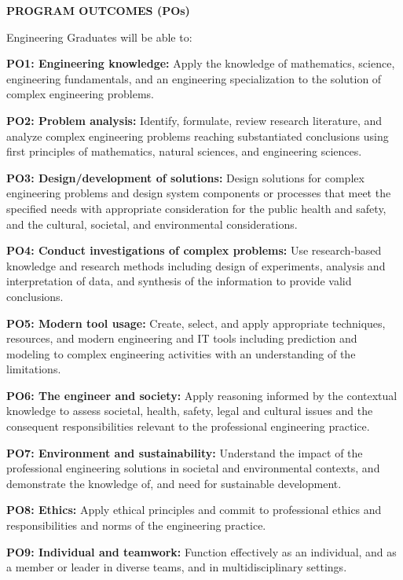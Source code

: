 \begin{flushleft}
{\size\textbf{PROGRAM OUTCOMES (POs)}}
\end{flushleft}

\noindent Engineering Graduates will be able to:

\vspace{5mm}

\noindent\textbf{PO1: Engineering knowledge:} Apply the knowledge of mathematics, science, engineering fundamentals, and an engineering specialization to the solution of complex engineering problems.

\noindent\textbf{PO2: Problem analysis:} Identify, formulate, review research literature, and analyze complex engineering problems reaching substantiated conclusions using first principles of mathematics, natural sciences, and engineering sciences.

\noindent\textbf{PO3: Design/development of solutions:} Design solutions for complex engineering problems and design system components or processes that meet the specified needs with appropriate consideration for the public health and safety, and the cultural, societal, and environmental considerations.

\noindent\textbf{PO4: Conduct investigations of complex problems:} Use research-based knowledge and research methods including design of experiments, analysis and interpretation of data, and synthesis of the information to provide valid conclusions.

\noindent\textbf{PO5: Modern tool usage:} Create, select, and apply appropriate techniques, resources, and modern engineering and IT tools including prediction and modeling to complex engineering activities with an understanding of the limitations.

\noindent\textbf{PO6: The engineer and society:} Apply reasoning informed by the contextual knowledge to assess societal, health, safety, legal and cultural issues and the consequent responsibilities relevant to the professional engineering practice.

\noindent\textbf{PO7: Environment and sustainability:} Understand the impact of the professional engineering solutions in societal and environmental contexts, and demonstrate the knowledge of, and need for sustainable development.

\noindent\textbf{PO8: Ethics:} Apply ethical principles and commit to professional ethics and responsibilities and norms of the engineering practice.

\noindent\textbf{PO9: Individual and teamwork:} Function effectively as an individual, and as a member or leader in diverse teams, and in multidisciplinary settings.

